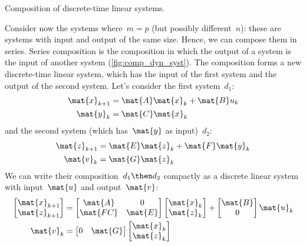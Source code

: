 \begin{marginfigure}
  \begin{center}
  \end{center}
  \caption{Composition of discrete-time linear systems.}
  \label{fig:comp_dyn_syst}
\end{marginfigure}

Consider now the systems where~$m=p$ (but possibly different~$n$): these are systems with input and output of the same size.
Hence, we can compose them in series.
Series composition is the composition in which the output of a system is the input of another system (\cref{fig:comp_dyn_syst}).
The composition forms a new discrete-time linear system, which has the input of the first system and the output of the second system.
Let's consider the first system~$d_1$:
\begin{equation*}
  \label{eq:dlin-1}
  \begin{aligned}
    \mat{x}_{k+1} &= \mat{A} \mat{x}_k + \mat{B} u_k \\
    \mat{y}_{k}   &= \mat{C} \mat{x}_k
  \end{aligned}
\end{equation*}
and the second system (which has~$\mat{y}$ as input)~$d_2$:
\begin{equation*}
  \label{eq:dlin-2}
  \begin{aligned}
    \mat{z}_{k+1} &= \mat{E} \mat{z}_k + \mat{F} \mat{y}_k \\
    \mat{v}_{k}   &= \mat{G} \mat{z}_k
  \end{aligned}
\end{equation*}
We can write their composition~$d_1\then d_2$ compactly as a discrete linear system with input~$\mat{u}$ and output~$\mat{v}$:
\begin{equation*}
  \label{eq:dlin-3}
  \begin{aligned}
    \begin{bmatrix}
      \mat{x}_{k+1}\\
      \mat{z}_{k+1}
    \end{bmatrix}&=
    \begin{bmatrix}
      \mat{A}&0\\
      \mat{FC}&\mat{E}
    \end{bmatrix}\begin{bmatrix}
                   \mat{x}_k\\ \mat{z}_k
    \end{bmatrix}+
    \begin{bmatrix}
      \mat{B}\\ 0
    \end{bmatrix}\mat{u}_k\\
    \mat{v}_k&=\begin{bmatrix} 0&\mat{G}\end{bmatrix} \begin{bmatrix} \mat{x}_k \\ \mat{z}_k\end{bmatrix}
  \end{aligned}
\end{equation*}


